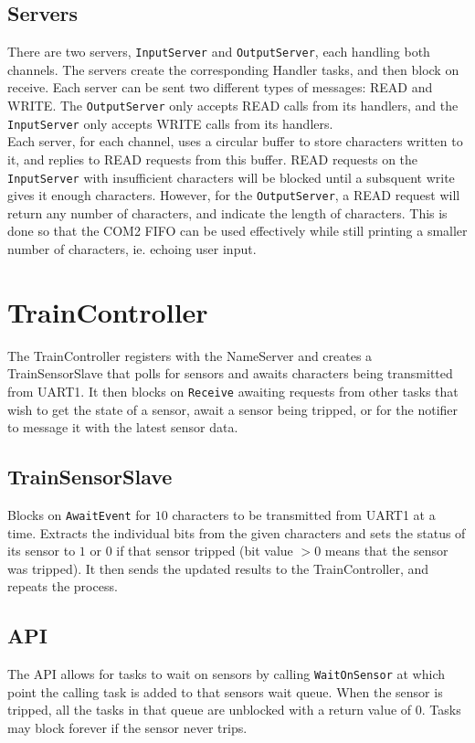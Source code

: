 \documentclass[12pt]{article}
\begin{document}
\subsection{Servers}
There are two servers, \texttt{InputServer} and \texttt{OutputServer}, each handling both channels. The servers create
the corresponding Handler tasks, and then block on receive. Each server can be sent two different types of messages:
READ and WRITE. The \texttt{OutputServer} only accepts READ calls from its handlers, and the \texttt{InputServer} only
accepts WRITE calls from its handlers.
\\
Each server, for each channel, uses a circular buffer to store characters written to it, and replies to READ requests
from this buffer. READ requests on the \texttt{InputServer} with insufficient characters will be blocked until a
subsquent write gives it enough characters. However, for the \texttt{OutputServer}, a READ request will return any
number of characters, and indicate the length of characters. This is done so that the COM2 FIFO can be used effectively
while still printing a smaller number of characters, ie. echoing user input.

\section{TrainController}
The TrainController registers with the NameServer and creates a TrainSensorSlave that polls for sensors and awaits characters being transmitted from UART1.  It then blocks on \texttt{Receive} awaiting requests from other tasks that wish to get the state of a sensor, await a sensor being tripped, or for the notifier to message it with the latest sensor data.
\\
\subsection{TrainSensorSlave}
Blocks on \texttt{AwaitEvent} for $10$ characters to be transmitted from UART1 at a time.  Extracts the individual bits from the given characters and sets the status of its sensor to $1$ or $0$ if that sensor tripped (bit value $> 0$ means that the sensor was tripped).  It then sends the updated results to the TrainController, and repeats the process.
\\[1\baselineskip]
\subsection{API}
The API allows for tasks to wait on sensors by calling \texttt{WaitOnSensor} at which point the calling task is added to that sensors wait queue.  When the sensor is tripped, all the tasks in that queue are unblocked with a return value of $0$.  Tasks may block forever if the sensor never trips.
\\[2\baselineskip]
\end{document}
